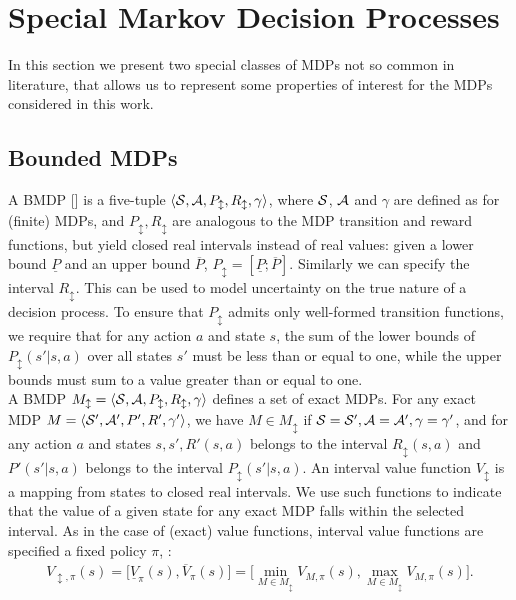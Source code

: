 \section{Special Markov Decision Processes} \label{sec:specmdp}
In this section we present two special classes of \ac{MDPs} not so common in literature, that allows us to represent some properties of interest for the \ac{MDPs} considered in this work.

\subsection{Bounded \ac{MDPs}} \label{subsec:bmdp}
A \acf{BMDP} [\cite{givan2000bounded}] is a five-tuple $\langle \mathcal{S}, \mathcal{A}, P_{\updownarrow}, R_{\updownarrow}, \gamma \rangle$, where $\mathcal{S}$, $\mathcal{A}$ and $\gamma$ are defined as for (finite) MDPs, and $P_{\updownarrow}, R_{\updownarrow}$ are analogous to the MDP transition and reward functions, but yield closed real intervals instead of real values: given a lower bound $\underline{P}$ and an upper bound $\overline{P}$, $P_{\updownarrow} = [\underline{P}; \overline{P}]$. Similarly we can specify the interval $R_{\updownarrow}$. This can be used to model uncertainty on the true nature of a decision process. To ensure that $P_{\updownarrow}$ admits only well-formed transition functions, we require that for any action $a$ and state $s$, the sum of the lower bounds of $P_{\updownarrow}(s'|s,a)$ over all states $s'$ must be less than or equal to one, while the upper bounds must sum to a value greater than or equal to one.\\
\newline
A BMDP $M_{\updownarrow} = \langle \mathcal{S}, \mathcal{A}, P_{\updownarrow}, R_{\updownarrow}, \gamma \rangle$ defines a set of exact MDPs. For any exact MDP $M = \langle \mathcal{S}', \mathcal{A}', P', R', \gamma' \rangle$, we have $M \in M_{\updownarrow}$ if $\mathcal{S} = \mathcal{S}', \mathcal{A} = \mathcal{A}', \gamma = \gamma'$, and for any action $a$ and states $s, s', R'(s,a)$ belongs to the interval $R_{\updownarrow}(s,a)$ and $P'(s'|s,a)$ belongs to the interval $P_{\updownarrow}(s'|s,a)$. An interval value function $V_{\updownarrow}$ is a mapping from states to closed real intervals. We use such functions to indicate that the value of a given state for any exact MDP falls within the selected interval. As in the case of (exact) value functions, interval value functions are specified \wrt a fixed policy $\pi$, \ie:
\begin{align} V_{\updownarrow, \pi}(s) = \Big[ \underline{V}_{\pi}(s), \overline{V}_{\pi}(s)\Big] = \Big[ \min_{M \in M_{\updownarrow}} V_{M,\pi}(s), \max_{M \in M_{\updownarrow}} V_{M,\pi}(s)\Big]. \end{align}
